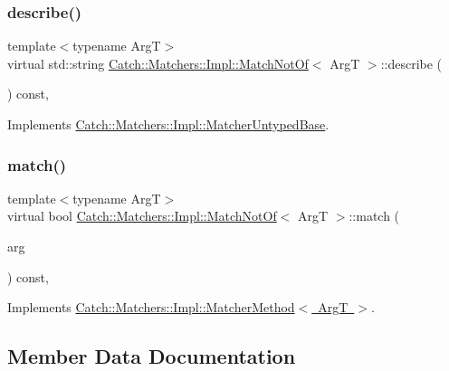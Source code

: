 \subsubsection{\texorpdfstring{describe()}{describe()}}
{\footnotesize\ttfamily template$<$typename ArgT$>$ \\
virtual std\+::string \mbox{\hyperlink{struct_catch_1_1_matchers_1_1_impl_1_1_match_not_of}{Catch\+::\+Matchers\+::\+Impl\+::\+Match\+Not\+Of}}$<$ ArgT $>$\+::describe (\begin{DoxyParamCaption}{ }\end{DoxyParamCaption}) const\hspace{0.3cm}{\ttfamily [inline]}, {\ttfamily [virtual]}}



Implements \mbox{\hyperlink{class_catch_1_1_matchers_1_1_impl_1_1_matcher_untyped_base_a91d3a907dbfcbb596077df24f6e11fe2}{Catch\+::\+Matchers\+::\+Impl\+::\+Matcher\+Untyped\+Base}}.

\mbox{\label{struct_catch_1_1_matchers_1_1_impl_1_1_match_not_of_a1b9ad6566e4ab0f292d2903f557307cc}} 
\subsubsection{\texorpdfstring{match()}{match()}}
{\footnotesize\ttfamily template$<$typename ArgT$>$ \\
virtual bool \mbox{\hyperlink{struct_catch_1_1_matchers_1_1_impl_1_1_match_not_of}{Catch\+::\+Matchers\+::\+Impl\+::\+Match\+Not\+Of}}$<$ ArgT $>$\+::match (\begin{DoxyParamCaption}\item[{ArgT const \&}]{arg }\end{DoxyParamCaption}) const\hspace{0.3cm}{\ttfamily [inline]}, {\ttfamily [virtual]}}



Implements \mbox{\hyperlink{struct_catch_1_1_matchers_1_1_impl_1_1_matcher_method_ae0920ff9e817acf08e1bb0cbcb044e30}{Catch\+::\+Matchers\+::\+Impl\+::\+Matcher\+Method$<$ Arg\+T $>$}}.



\subsection{Member Data Documentation}
\mbox{\label{struct_catch_1_1_matchers_1_1_impl_1_1_match_not_of_af7ac67f112b0e93796b048a47329aad4}} 

